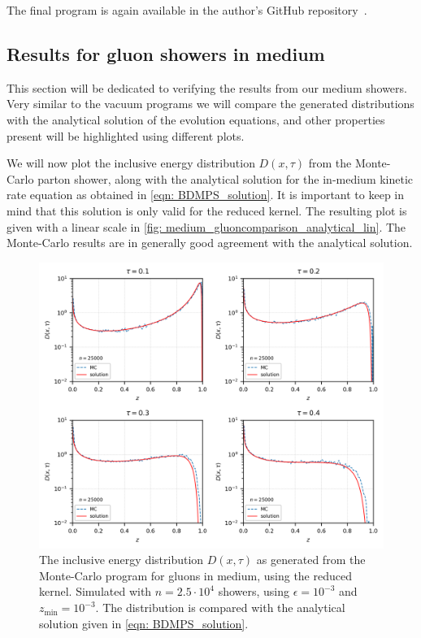 \documentclass[main.tex]{subfiles}
\begin{document}
The final program is again available in the author's GitHub repository~\cite{GitHub_thesis}.

\subsection{Results for gluon showers in medium}
This section will be dedicated to verifying the results from our medium showers. Very similar to the vacuum programs we will compare the generated distributions with the analytical solution of the evolution equations, and other properties present will be highlighted using different plots.

We will now plot the inclusive energy distribution \(D(x,\tau)\) from the Monte-Carlo parton shower, along with the analytical solution for the in-medium kinetic rate equation as obtained in \autoref{eqn: BDMPS_solution}. It is important to keep in mind that this solution is only valid for the reduced kernel. The resulting plot is given with a linear scale in \autoref{fig: medium_gluoncomparison_analytical_lin}. The Monte-Carlo results are in generally good agreement with the analytical solution. 
\begin{figure}[htb]
    \centering
    \includegraphics[width=13cm]{pictures/plots/distributions/medium/medium_shower__25k_lin.png}
    \caption{The inclusive energy distribution \(D(x,\tau)\) as generated from the Monte-Carlo program for gluons in medium, using the reduced kernel. Simulated with \(n=2.5 \cdot 10^4\) showers, using \(\epsilon=10^{-3}\) and \(z_{\text{min}} = 10^{-3}\). The distribution is compared with the analytical solution given in \autoref{eqn: BDMPS_solution}.}
    \label{fig: medium_gluoncomparison_analytical_lin}
\end{figure}
\end{document}
